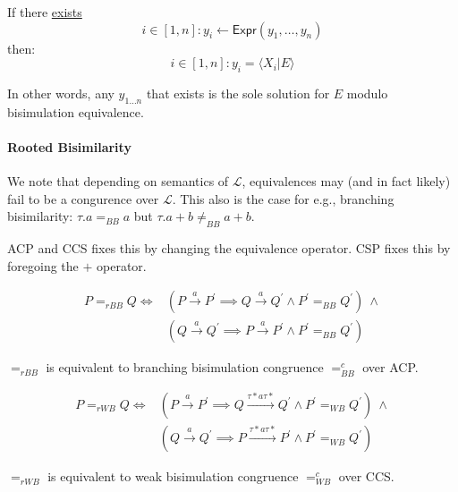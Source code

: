 \documentclass[99-notes-packed.tex]{subfiles}
\begin{document}
\begin{definition}
    If there \underline{exists}
    \begin{equation*}
        i \in [1, n]: y_i \leftarrow \mathsf{Expr}(y_1, \dots, y_n)
    \end{equation*}
    then: 
    \begin{equation*}
        i \in [1, n]: y_i = \langle X_i | E \rangle
    \end{equation*}

    In other words, any $y_{1 \dots n}$ that exists is the sole solution for $E$ modulo bisimulation equivalence. 
\end{definition}

\paragraph*{Rooted Bisimilarity}
We note that depending on semantics of $\mathcal{L}$, equivalences may (and in fact likely) fail to be a congurence over $\mathcal{L}$. This also is the case for e.g., branching bisimilarity: $\tau.a =_{BB} a$ but $\tau.a + b \ne_{BB} a + b$. 

ACP and CCS fixes this by changing the equivalence operator. CSP fixes this by foregoing the $+$ operator.
\begin{definition}
    \begin{align*}
        P =_{rBB} Q \iff &(P \xrightarrow{a} P^{'} \implies Q \xrightarrow{a} Q^{'} \wedge P^{'} =_{BB} Q^{'})\ \wedge \\
        &(Q \xrightarrow{a} Q^{'} \implies P \xrightarrow{a} P^{'} \wedge P^{'} =_{BB} Q^{'})
    \end{align*}

    $=_{rBB}$ is equivalent to branching bisimulation congruence $=_{BB}^c$ over ACP.
\end{definition}

\begin{definition}
    \begin{align*}
        P =_{rWB} Q \iff &(P \xrightarrow{a} P^{'} \implies Q \xrightarrow{\tau \ast a \tau \ast} Q^{'} \wedge P^{'} =_{WB} Q^{'})\ \wedge \\
        &(Q \xrightarrow{a} Q^{'} \implies P \xrightarrow{\tau \ast a \tau \ast} P^{'} \wedge P^{'} =_{WB} Q^{'})
    \end{align*}

    $=_{rWB}$ is equivalent to weak bisimulation congruence $=_{WB}^c$ over CCS.
\end{definition}
\end{document}
